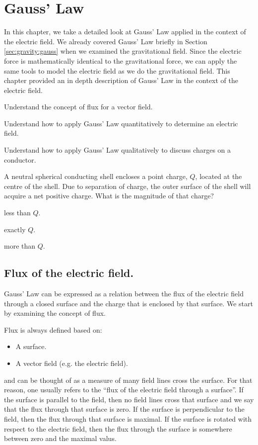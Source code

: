 
\chapter{Gauss' Law}
\label{chapter:gauss}
In this chapter, we take a detailed look at Gauss' Law applied in the context of the electric field. We already covered Gauss' Law briefly in Section \ref{sec:gravity:gauss} when we examined the gravitational field. Since the electric force is mathematically identical to the gravitational force, we can apply the same tools to model the electric field as we do the gravitational field. This chapter provided an in depth description of Gauss' Law in the context of the electric field. 

\begin{learningObjectives}{
 \item Understand the concept of flux for a vector field.
 \item Understand how to apply Gauss' Law quantitatively to determine an electric field.
 \item Understand how to apply Gauss' Law qualitatively to discuss charges on a conductor.
 }
\end{learningObjectives}

\begin{opening}
\begin{MCquestion}{A neutral spherical conducting shell encloses a point charge, $Q$, located at the centre of the shell. Due to separation of charge, the outer surface of the shell will acquire a net positive charge. What is the magnitude of that charge? }
\item less than $Q$.
\item exactly $Q$. \correct
\item more than $Q$.
\end{MCquestion}
\end{opening}

\section{Flux of the electric field.}
Gauss' Law can be expressed as a relation between the flux of the electric field through a closed surface and the charge that is enclosed by that surface. We start by examining the concept of flux. 

Flux is always defined based on:
\begin{itemize}
\item A surface.
\item A vector field (e.g. the electric field). 
\end{itemize}
and can be thought of as a measure of many field lines cross the surface. For that reason, one usually refers to the ``flux of the electric field through a surface''. If the surface is parallel to the field, then no field lines cross that surface and we say that the flux through that surface is zero. If the surface is perpendicular to the field, then the flux through that surface is maximal. If the surface is rotated with respect to the electric field, then the flux through the surface is somewhere between zero and the maximal valus.

